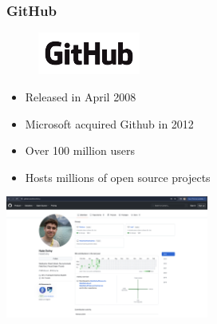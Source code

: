 \documentclass{beamer}
\begin{document}
\begin{frame}
	\frametitle{\textbf{GitHub}}
		
	\begin{multicols}{2}
		\begin{figure}[h]
			\centering
			\includegraphics[width=0.3\textwidth]{img/GitHub_logo.png} 
		\end{figure}

		\begin{itemize}
			\item Released in April 2008 
			\item Microsoft acquired Github in 2012 
			\item Over 100 million users
			\item Hosts millions of open source projects
		\end{itemize}

		\includegraphics[width=0.5\textwidth]{img/github_ui.png} 
	\end{multicols}
\end{frame}
\end{document}

